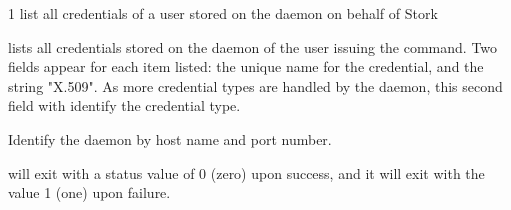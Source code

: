 \begin{ManPage}{\label{man-stork-list-cred}}{1}
{list all credentials of a user stored on the  daemon on behalf of Stork}
\Synopsis {}
\ToolArgsBase




\Description 

 lists all credentials stored on the  daemon
of the user issuing the  command.
Two fields appear for each item listed:
the unique name for the credential,
and the string "X.509".
As more credential types are handled by the  daemon,
this second field with identify the credential type.


\begin{Options}
  \ToolArgsBaseDesc
    {Identify the  daemon by host name and port number.}
\end{Options}

\ExitStatus

 will exit with a status value of 0 (zero) upon success,
and it will exit with the value 1 (one) upon failure.

\end{ManPage}
